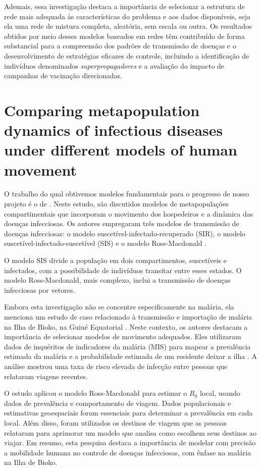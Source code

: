 Ademais, essa investigação destaca a importância de selecionar a estrutura de rede mais adequada às características do problema e aos dados disponíveis, seja ela uma rede de mistura completa, aleatória, sem escala ou outra. Os resultados obtidos por meio desses modelos baseados em redes têm contribuído de forma substancial para a compreensão dos padrões de transmissão de doenças e o desenvolvimento de estratégias eficazes de controle, incluindo a identificação de indivíduos denominados \textit{superpropagadores} e a avaliação do impacto de campanhas de vacinação direcionadas.

\section{Comparing metapopulation dynamics of infectious diseases under different models of human movement}

O trabalho do qual obtivemos modelos fundamentais para o progresso de nosso projeto é o de . Neste estudo, são discutidos modelos de metapopulações compartimentais que incorporam o movimento dos hospedeiros e a dinâmica das doenças infecciosas. Os autores empregaram três modelos de transmissão de doenças infecciosas: o modelo suscetível-infectado-recuperado (SIR), o modelo suscetível-infectado-suscetível (SIS) \cite{Kermack1927} e o modelo Ross-Macdonald \cite{SIMOY2020105452}.

O modelo SIS divide a população em dois compartimentos, suscetíveis e infectados, com a possibilidade de indivíduos transitar entre esses estados. O modelo Ross-Macdonald, mais complexo, inclui a transmissão de doenças infecciosas por vetores.

Embora esta investigação não se concentre especificamente na malária, ela menciona um estudo de caso relacionado à transmissão e importação de malária na Ilha de Bioko, na Guiné Equatorial \cite{Guerra2019}. Neste contexto, os autores destacam a importância de selecionar modelos de movimento adequados. Eles utilizaram dados de inquéritos de indicadores da malária (MIS) \cite{citron2020supporting} para mapear a prevalência estimada da malária e a probabilidade estimada de um residente deixar a ilha . A análise mostrou uma taxa de risco elevada de infecção entre pessoas que relataram viagens recentes.

O estudo aplicou o modelo Ross-Macdonald para estimar o $R_{0}$ local, usando dados de prevalência e comportamento de viagem. Dados populacionais e estimativas geoespaciais foram essenciais para determinar a prevalência em cada local. Além disso, foram utilizados os destinos de viagem que as pessoas relataram para aprimorar um modelo que analisa como escolhem seus destinos ao viajar. Em resumo, esta pesquisa destaca a importância de modelar com precisão a mobilidade humana no controle de doenças infecciosas, com ênfase na malária na Ilha de Bioko.